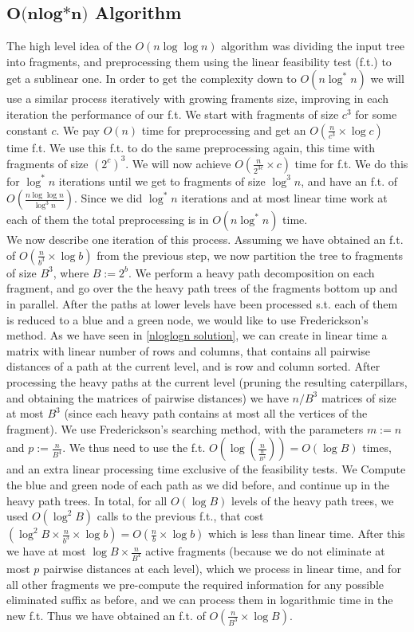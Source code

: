 \documentclass[11pt,a4paper]{article}
\theoremstyle{definition}
\theoremstyle{remark}
\begin{document}
\subsection{$\textbf{O(nlog*n)}$ Algorithm}
The high level idea of the $O(n \log \log n)$ algorithm was dividing the input tree into fragments, and preprocessing them using the linear feasibility test (f.t.) to get a sublinear one. In order to get the complexity down to $O(n \log ^*n)$ we will use a similar process iteratively with growing framents size, improving in each iteration the performance of our f.t.
We start with fragments of size $c^3$ for some constant $c$.
We pay $O(n)$ time for preprocessing and get an $O(\frac{n}{c^3} \times \log c)$ time f.t.
We use this f.t. to do the same preprocessing again, this time with fragments of size $(2^c)^3$.
We will now achieve $O(\frac{n}{2^{3c}} \times c)$ time for f.t.
We do this for $\log ^*n$ iterations until we get to fragments of size $\log ^3n$, and have an f.t. of $O(\frac{n \log \log n}{\log ^3n})$.
Since we did $\log ^*n$ iterations and at most linear time work at each of them the total preprocessing is in $O(n \log ^*n)$ time.\\
We now describe one iteration of this process.
Assuming we have obtained an f.t. of $O(\frac{n}{b^3} \times \log b)$ from the previous step, we now partition the tree to fragments of size $B^3$, where $B:=2^b$. We perform a heavy path decomposition on each fragment, and go over the the heavy path trees of the fragments bottom up and in parallel. After the paths at lower levels have been processed s.t. each of them is reduced to a blue and a green node, we would like to use Frederickson's method. As we have seen in \ref{nloglogn solution}, we can create in linear time a matrix with linear number of rows and columns, that contains all pairwise distances of a path at the current level, and is row and column sorted.
After processing the heavy paths at the current level (pruning the resulting caterpillars, and obtaining the matrices of pairwise distances) we have $n/B^3$ matrices of size at most $B^3$ (since each heavy path contains at most all the vertices of the fragment). We use Frederickson's searching method, with the parameters $m:=n$ and $p:=\frac{n}{B^4}$. We thus need to use the f.t. $O(\log (\frac{n}{\frac{n}{B^4}}))=O(\log B)$ times, and an extra linear processing time exclusive of the feasibility tests. We Compute the blue and green node of each path as we did before, and continue up in the heavy path trees. In total, for all $O(\log B)$ levels of the heavy path trees, we used $O(\log ^2B)$ calls to the previous f.t., that cost $(\log ^2B \times \frac{n}{b^3} \times \log b)=O(\frac{n}{b} \times \log b)$ which is less than linear time. After this we have at most $\log B \times \frac{n}{B^4}$ active fragments (because we do not eliminate at most $p$ pairwise distances at each level), which we process in linear time, and for all other fragments we pre-compute the required information for any possible eliminated suffix as before, and we can process them in logarithmic time in the new f.t. Thus we have obtained an f.t. of $O(\frac{n}{B^3} \times \log B)$.\\
\end{document}
